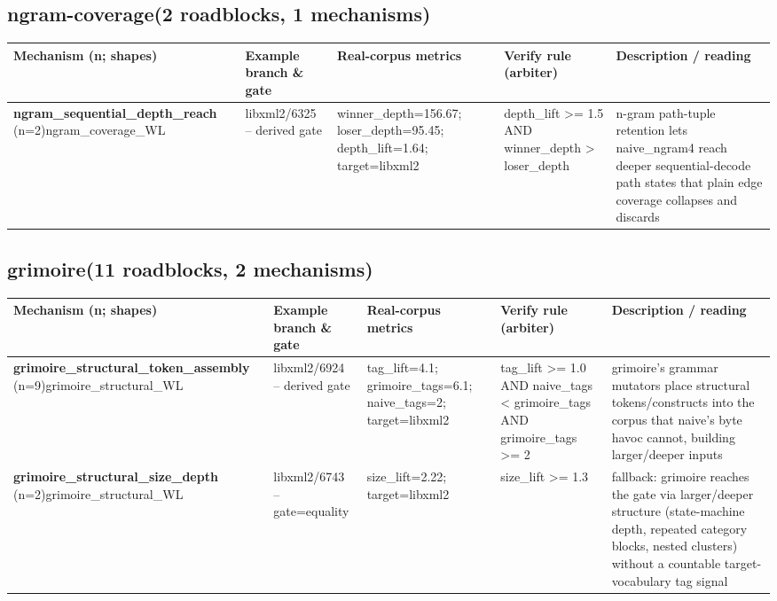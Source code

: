 \documentclass[7pt]{extarticle}
\begin{document}
\subsection*{ngram-coverage\quad(2 roadblocks, 1 mechanisms)}
{\scriptsize\begin{longtable}{@{}p{3.3cm}p{3.6cm}p{4.4cm}p{4.2cm}p{6.6cm}@{}}
\toprule \textbf{Mechanism (n; shapes)}&\textbf{Example branch \& gate}&\textbf{Real-corpus metrics}&\textbf{Verify rule (arbiter)}&\textbf{Description / reading}\\\midrule\endhead
\textbf{ngram\_\allowbreak sequential\_\allowbreak depth\_\allowbreak reach} (n=2)\newline ngram\_\allowbreak coverage\_\allowbreak WL & libxml2/6325 -- derived gate & winner\_\allowbreak depth=156.67; loser\_\allowbreak depth=95.45; depth\_\allowbreak lift=1.64; target=libxml2 & depth\_\allowbreak lift \textgreater{}= 1.5 AND winner\_\allowbreak depth \textgreater{} loser\_\allowbreak depth & n-gram path-tuple retention lets naive\_\allowbreak ngram4 reach deeper sequential-decode path states that plain edge coverage collapses and discards\\\midrule
\bottomrule\end{longtable}}\par\medskip
\subsection*{grimoire\quad(11 roadblocks, 2 mechanisms)}
{\scriptsize\begin{longtable}{@{}p{3.3cm}p{3.6cm}p{4.4cm}p{4.2cm}p{6.6cm}@{}}
\toprule \textbf{Mechanism (n; shapes)}&\textbf{Example branch \& gate}&\textbf{Real-corpus metrics}&\textbf{Verify rule (arbiter)}&\textbf{Description / reading}\\\midrule\endhead
\textbf{grimoire\_\allowbreak structural\_\allowbreak token\_\allowbreak assembly} (n=9)\newline grimoire\_\allowbreak structural\_\allowbreak WL & libxml2/6924 -- derived gate & tag\_\allowbreak lift=4.1; grimoire\_\allowbreak tags=6.1; naive\_\allowbreak tags=2; target=libxml2 & tag\_\allowbreak lift \textgreater{}= 1.0 AND naive\_\allowbreak tags \textless{} grimoire\_\allowbreak tags AND grimoire\_\allowbreak tags \textgreater{}= 2 & grimoire's grammar mutators place structural tokens/constructs into the corpus that naive's byte havoc cannot, building larger/deeper inputs\\\midrule
\textbf{grimoire\_\allowbreak structural\_\allowbreak size\_\allowbreak depth} (n=2)\newline grimoire\_\allowbreak structural\_\allowbreak WL & libxml2/6743 -- gate=equality & size\_\allowbreak lift=2.22; target=libxml2 & size\_\allowbreak lift \textgreater{}= 1.3 & fallback: grimoire reaches the gate via larger/deeper structure (state-machine depth, repeated category blocks, nested clusters) without a countable target-vocabulary tag signal\\\midrule
\bottomrule\end{longtable}}\par\medskip
\end{document}
